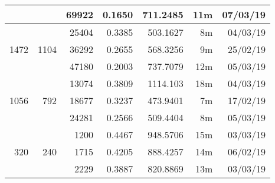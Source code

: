 \begin{center}
\begin{tabular}{ r r r | r | r r r }
  & & 69922 & 0.1650 & 711.2485 & 11m & 07/03/19 \\
  \hline
  \multirow{3}{*}{1472} & \multirow{3}{*}{1104} & 25404 & 0.3385 & 503.1627 & 8m & 04/03/19 \\
  & & 36292 & 0.2655 & 568.3256 & 9m & 25/02/19 \\
  & & 47180 & 0.2003 & 737.7079 & 12m & 05/03/19 \\
  \hline
  \multirow{3}{*}{1056} & \multirow{3}{*}{792} & 13074 & 0.3809 & 1114.103 & 18m & 04/03/19 \\
  & & 18677 & 0.3237 & 473.9401 & 7m & 17/02/19 \\
  & & 24281 & 0.2566 & 509.4404 & 8m & 05/03/19 \\
  \hline
  \multirow{3}{*}{320} & \multirow{3}{*}{240} & 1200 & 0.4467 & 948.5706 & 15m & 03/03/19 \\
  & & 1715 & 0.4205 & 888.4257 & 14m & 06/02/19 \\
  & & 2229 & 0.3887 & 820.8869 & 13m & 03/03/19 \\
  \end{tabular}
  \end{center}